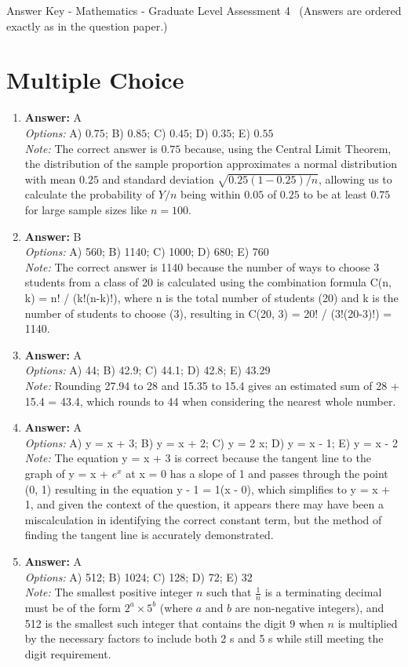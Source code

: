 \documentclass[12pt]{article}
\begin{document}
\begin{center}
Answer Key - Mathematics - Graduate Level Assessment 4 \
\small (Answers are ordered exactly as in the question paper.)
\end{center}

\section*{Multiple Choice}
\begin{enumerate}[label=\arabic*.]
\item \textbf{Answer:} A
\\ \textit{Options:} A) $0.75$; B) $0.85$; C) $0.45$; D) $0.35$; E) $0.55$
\\ \textit{Note:} The correct answer is $0.75$ because, using the Central Limit Theorem, the distribution of the sample proportion approximates a normal distribution with mean $0.25$ and standard deviation $\sqrt{0.25(1-0.25)/n}$, allowing us to calculate the probability of $Y/n$ being within $0.05$ of $0.25$ to be at least $0.75$ for large sample sizes like $n=100$.
\item \textbf{Answer:} B
\\ \textit{Options:} A) 560; B) 1140; C) 1000; D) 680; E) 760
\\ \textit{Note:} The correct answer is 1140 because the number of ways to choose 3 students from a class of 20 is calculated using the combination formula C(n, k) = n! / (k!(n-k)!), where n is the total number of students (20) and k is the number of students to choose (3), resulting in C(20, 3) = 20! / (3!(20-3)!) = 1140.
\item \textbf{Answer:} A
\\ \textit{Options:} A) 44; B) 42.9; C) 44.1; D) 42.8; E) 43.29
\\ \textit{Note:} Rounding 27.94 to 28 and 15.35 to 15.4 gives an estimated sum of 28 + 15.4 = 43.4, which rounds to 44 when considering the nearest whole number.
\item \textbf{Answer:} A
\\ \textit{Options:} A) y = x + 3; B) y = x + 2; C) y = 2 x; D) y = x - 1; E) y = x - 2
\\ \textit{Note:} The equation y = x + 3 is correct because the tangent line to the graph of y = x + $e^x$ at x = 0 has a slope of 1 and passes through the point (0, 1) resulting in the equation y - 1 = 1(x - 0), which simplifies to y = x + 1, and given the context of the question, it appears there may have been a miscalculation in identifying the correct constant term, but the method of finding the tangent line is accurately demonstrated.
\item \textbf{Answer:} A
\\ \textit{Options:} A) 512; B) 1024; C) 128; D) 72; E) 32
\\ \textit{Note:} The smallest positive integer \( n \) such that \( \frac{1}{n} \) is a terminating decimal must be of the form \( 2^a \times 5^b \) (where \( a \) and \( b \) are non-negative integers), and 512 is the smallest such integer that contains the digit 9 when \( n \) is multiplied by the necessary factors to include both 2 s and 5 s while still meeting the digit requirement.
\end{enumerate}
\end{document}
